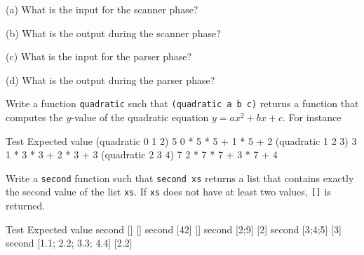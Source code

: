 (a) What is the input for the scanner phase?
\\
\ANSWER
\begin{answercode}

\end{answercode}

(b) What is the output during the scanner phase?
\\
\ANSWER
\begin{answercode}

\end{answercode}

(c) What is the input for the parser phase?
\\
\ANSWER
\begin{answercode}
  
\end{answercode}

(d) What is the output during the parser phase?
\\
\ANSWER
\begin{answercode}

\end{answercode}

\newpage
\nextq
Write a function \verb!quadratic! such that
\verb!(quadratic a b c)! returns a function that computes the $y$-value
of the quadratic equation $y = ax^2 + bx + c$.
For instance 

\begin{console}[frame=none]
        Test                       Expected value
        (quadratic 0 1 2) 5        0 * 5 * 5 + 1 * 5 + 2
        (quadratic 1 2 3) 3        1 * 3 * 3 + 2 * 3 + 3
        (quadratic 2 3 4) 7        2 * 7 * 7 + 3 * 7 + 4
\end{console}

\ANSWER
\begin{answercode}
  
\end{answercode}

\newpage
\nextq
Write a \verb!second! function such that \verb!second xs!
returns a list that contains exactly the second value of
the list \verb!xs!.
If \verb!xs! does not have at least two values, \verb![]! is returned.

\begin{console}[frame=none]
	Test                         Expected value
	second []                    []
        second [42]                  []
	second [2;9]                 [2]
	second [3;4;5]               [3]
        second [1.1; 2.2; 3.3; 4.4]  [2.2]
\end{console}

